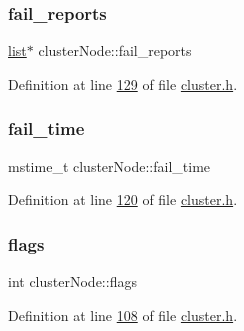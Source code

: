 \mbox{\label{structclusterNode_ab683b7bff2f7ea87a9f42def23e8400f}} 
\subsubsection{\texorpdfstring{fail\+\_\+reports}{fail\_reports}}
{\footnotesize\ttfamily \hyperlink{structlist}{list}$\ast$ cluster\+Node\+::fail\+\_\+reports}



Definition at line \hyperlink{cluster_8h_source_l00129}{129} of file \hyperlink{cluster_8h_source}{cluster.\+h}.

\mbox{\label{structclusterNode_ab2aa62006e87ba83e3139b9d28c6eb18}} 
\subsubsection{\texorpdfstring{fail\+\_\+time}{fail\_time}}
{\footnotesize\ttfamily mstime\+\_\+t cluster\+Node\+::fail\+\_\+time}



Definition at line \hyperlink{cluster_8h_source_l00120}{120} of file \hyperlink{cluster_8h_source}{cluster.\+h}.

\mbox{\label{structclusterNode_a496b52bc0e6536e9556c6eb2779c03eb}} 
\subsubsection{\texorpdfstring{flags}{flags}}
{\footnotesize\ttfamily int cluster\+Node\+::flags}



Definition at line \hyperlink{cluster_8h_source_l00108}{108} of file \hyperlink{cluster_8h_source}{cluster.\+h}.

\mbox{\label{structclusterNode_af5fe551fd3955ee170ac36422e6637f2}} 
